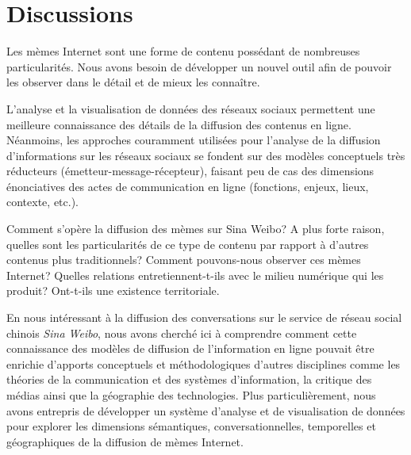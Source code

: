 \section[Discussions]{Discussions}




Les mèmes Internet sont une forme de contenu possédant de nombreuses particularités. 
Nous avons besoin de développer un nouvel outil afin de pouvoir les observer dans le détail et de mieux les connaître.

L{\textquoteright}analyse et la visualisation de données des réseaux  sociaux permettent une meilleure connaissance des détails de la  diffusion des contenus en ligne. Néanmoins, les approches couramment  utilisées pour l{\textquoteright}analyse de la diffusion  d{\textquoteright}informations sur les réseaux sociaux se fondent sur  des modèles conceptuels très réducteurs  (émetteur-message-récepteur), faisant peu de cas des dimensions  énonciatives des actes de communication en ligne (fonctions, enjeux,  lieux, contexte, etc.).


Comment s'opère la diffusion des mèmes sur Sina Weibo? A plus forte raison, quelles sont les particularités de ce type de contenu par rapport à d'autres contenus plus traditionnels? Comment pouvons-nous observer ces mèmes Internet? Quelles relations entretiennent-t-ils avec le milieu numérique qui les produit? Ont-t-ils une existence territoriale.

En nous intéressant à la diffusion des  conversations sur le service de réseau social chinois \textit{Sina  Weibo}, nous avons cherché ici à comprendre comment cette  connaissance des modèles de diffusion de  l{\textquoteright}information en ligne pouvait être enrichie  d{\textquoteright}apports conceptuels et méthodologiques  d{\textquoteright}autres disciplines comme les théories de la  communication et des systèmes d{\textquoteright}information, la  critique des médias ainsi que la géographie des technologies. Plus  particulièrement, nous avons entrepris de développer un système  d{\textquoteright}analyse et de visualisation de données pour  explorer les dimensions sémantiques, conversationnelles, temporelles  et géographiques de la diffusion de mèmes Internet.   

